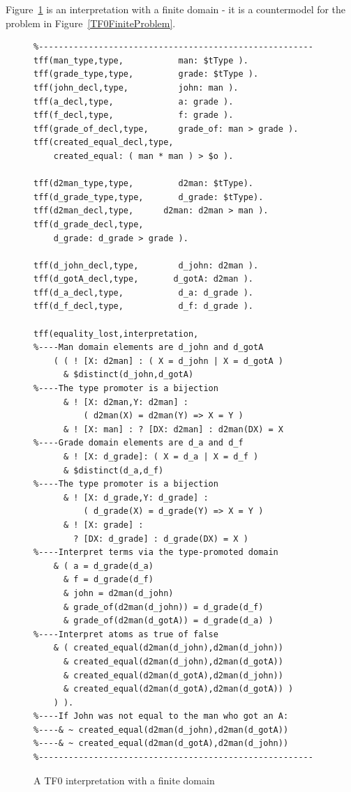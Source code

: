 \documentclass[letterpaper]{article}
\begin{document}
Figure~\ref{TF0FiniteInterpretation} is an interpretation with a finite domain - it is a 
countermodel for the problem in Figure~\ref{TF0FiniteProblem}.

\begin{figure}[htbp]
\scriptsize
{}
\begin{verbatim}
%-------------------------------------------------------
tff(man_type,type,           man: $tType ).
tff(grade_type,type,         grade: $tType ).
tff(john_decl,type,          john: man ).
tff(a_decl,type,             a: grade ).
tff(f_decl,type,             f: grade ).
tff(grade_of_decl,type,      grade_of: man > grade ).
tff(created_equal_decl,type, 
    created_equal: ( man * man ) > $o ).

tff(d2man_type,type,         d2man: $tType).
tff(d_grade_type,type,       d_grade: $tType).
tff(d2man_decl,type,      d2man: d2man > man ).
tff(d_grade_decl,type,    
    d_grade: d_grade > grade ).

tff(d_john_decl,type,        d_john: d2man ).
tff(d_gotA_decl,type,       d_gotA: d2man ).
tff(d_a_decl,type,           d_a: d_grade ).
tff(d_f_decl,type,           d_f: d_grade ).

tff(equality_lost,interpretation,
%----Man domain elements are d_john and d_gotA
    ( ( ! [X: d2man] : ( X = d_john | X = d_gotA )
      & $distinct(d_john,d_gotA)
%----The type promoter is a bijection 
      & ! [X: d2man,Y: d2man] : 
          ( d2man(X) = d2man(Y) => X = Y )
      & ! [X: man] : ? [DX: d2man] : d2man(DX) = X
%----Grade domain elements are d_a and d_f
      & ! [X: d_grade]: ( X = d_a | X = d_f )
      & $distinct(d_a,d_f)
%----The type promoter is a bijection 
      & ! [X: d_grade,Y: d_grade] : 
          ( d_grade(X) = d_grade(Y) => X = Y )
      & ! [X: grade] : 
        ? [DX: d_grade] : d_grade(DX) = X )
%----Interpret terms via the type-promoted domain
    & ( a = d_grade(d_a)
      & f = d_grade(d_f)
      & john = d2man(d_john)
      & grade_of(d2man(d_john)) = d_grade(d_f)
      & grade_of(d2man(d_gotA)) = d_grade(d_a) )
%----Interpret atoms as true of false
    & ( created_equal(d2man(d_john),d2man(d_john))
      & created_equal(d2man(d_john),d2man(d_gotA))
      & created_equal(d2man(d_gotA),d2man(d_john))
      & created_equal(d2man(d_gotA),d2man(d_gotA)) ) 
    ) ).
%----If John was not equal to the man who got an A:
%----& ~ created_equal(d2man(d_john),d2man(d_gotA))
%----& ~ created_equal(d2man(d_gotA),d2man(d_john))
%-------------------------------------------------------
\end{verbatim}
\caption{A TF0 interpretation with a finite domain}
\label{TF0FiniteInterpretation}
\end{figure}
\end{document}
